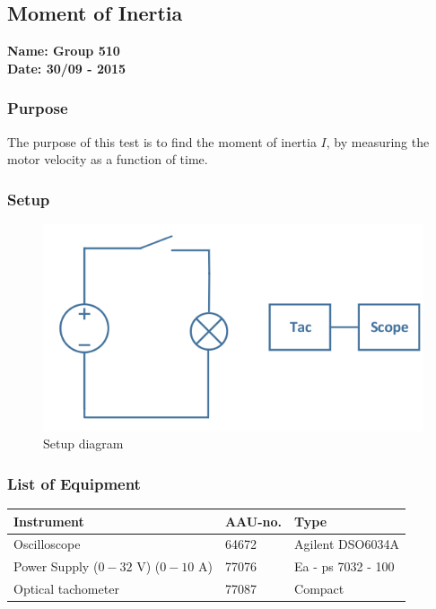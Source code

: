 \pagebreak
\subsection{Moment of Inertia} %
\textbf{Name: Group 510}\\
\textbf{Date: 30/09 - 2015}

\subsubsection{Purpose}
The purpose of this test is to find the moment of inertia $I$, by measuring the motor velocity as a function of time.

\subsubsection{Setup}
\begin{figure}[H]
  \centering
	\includegraphics[scale=0.5]{figures/MotorTest8.png}
	\caption{Setup diagram}
\end{figure}

\subsubsection{List of Equipment}

\begin{table}[H]
\begin{tabular}{|l|l|p{4cm}|}
\hline%
  \textbf{Instrument}                        &  \textbf{AAU-no.}  &  \textbf{Type}       \\
\hline%
  Oscilloscope                               &  64672             &  Agilent DSO6034A    \\
\hline%
  Power Supply ($0 - 32$ V) ($0 - 10$ A)     &  77076             &  Ea - ps 7032 - 100  \\
\hline%
  Optical tachometer                         &  77087             &  Compact             \\
\hline%
\end{tabular}
\end{table}

